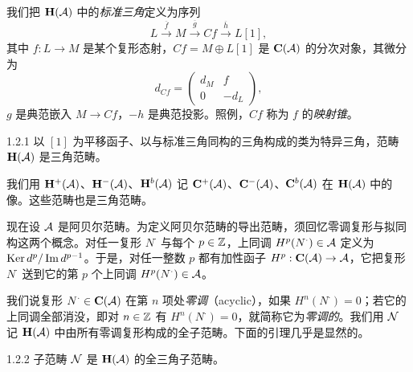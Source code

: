 我们把 $\mathbf{H}(\mathcal{A})$ 中的\emph{标准三角}定义为序列
\begin{equation*}
L\xrightarrow{\ \overline{f}\ }M\xrightarrow{\ \overline{g}\ }Cf\xrightarrow{\ \overline{h}\ }L[1],
\end{equation*}
其中 $f:L\to M$ 是某个复形态射，$Cf=M\oplus L[1]$ 是 $\mathbf{C}(\mathcal{A})$ 的分次对象，其微分为
\begin{equation*}
d_{Cf}=\begin{pmatrix} d_{M} & f\\ 0 & -d_{L}\end{pmatrix},
\end{equation*}
$g$ 是典范嵌入 $M\to Cf$，$-h$ 是典范投影。照例，$Cf$ 称为 $f$ 的\emph{映射锥}。


\begin{lemma}{1.2.1}
以 $[1]$ 为平移函子、以与标准三角同构的三角构成的类为特异三角，范畴 $\mathbf{H}(\mathcal{A})$ 是三角范畴。
\end{lemma}

我们用 $\mathbf{H}^{+}(\mathcal{A})$、$\mathbf{H}^{-}(\mathcal{A})$、$\mathbf{H}^{b}(\mathcal{A})$ 记 $\mathbf{C}^{+}(\mathcal{A})$、$\mathbf{C}^{-}(\mathcal{A})$、$\mathbf{C}^{b}(\mathcal{A})$ 在 $\mathbf{H}(\mathcal{A})$ 中的像。这些范畴也是三角范畴。

现在设 $\mathcal{A}$ 是阿贝尔范畴。为定义阿贝尔范畴的导出范畴，须回忆零调复形与拟同构这两个概念。对任一复形 $N^{\cdot}$ 与每个 $p\in\mathbb{Z}$，上同调 $H^{p}(N^{\cdot})\in\mathcal{A}$ 定义为 $\operatorname{Ker} d^{p}/\operatorname{Im} d^{p-1}$。于是，对任一整数 $p$ 都有加性函子 $H^{p}:\mathbf{C}(\mathcal{A})\to\mathcal{A}$，它把复形 $N^{\cdot}$ 送到它的第 $p$ 个上同调 $H^{p}(N^{\cdot})\in\mathcal{A}$。

我们说复形 $N^{\cdot}\in\mathbf{C}(\mathcal{A})$ 在第 $n$ 项处\emph{零调}（acyclic），如果 $H^{n}(N^{\cdot})=0$；若它的上同调全部消没，即对 $n\in\mathbb{Z}$ 有 $H^{n}(N^{\cdot})=0$，就简称它为\emph{零调的}。我们用 $\mathcal{N}$ 记 $\mathbf{H}(\mathcal{A})$ 中由所有零调复形构成的全子范畴。下面的引理几乎是显然的。

\begin{lemma}{1.2.2}
子范畴 $\mathcal{N}$ 是 $\mathbf{H}(\mathcal{A})$ 的全三角子范畴。
\end{lemma}


